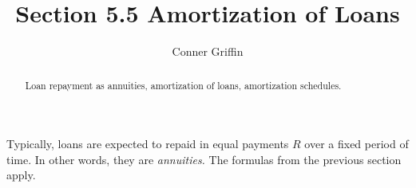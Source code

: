 \documentclass{ximera}
\title{Section 5.5 Amortization of Loans}
\author{Conner Griffin}
\begin{document}
\begin{abstract}
    Loan repayment as annuities, amortization of loans, amortization schedules.
\end{abstract}
\maketitle

Typically, loans are expected to repaid in equal payments \(R\) over a fixed period of time. In other words, they are \emph{annuities.} The formulas from the previous section apply.




\end{document}
